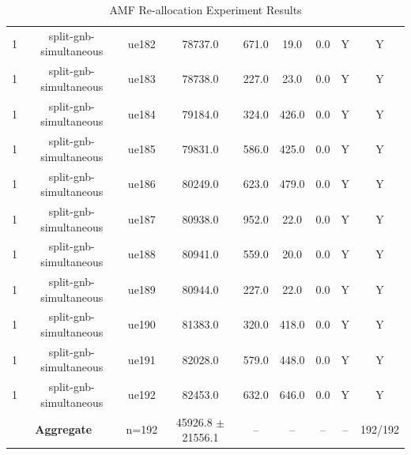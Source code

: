 \begin{table}[ht]
\begin{tabular}{|c|c|c|c|c|c|c|c|c|}
1 & split-gnb-simultaneous & ue182 & 78737.0 & 671.0 & 19.0 & 0.0 & Y & Y \\
1 & split-gnb-simultaneous & ue183 & 78738.0 & 227.0 & 23.0 & 0.0 & Y & Y \\
1 & split-gnb-simultaneous & ue184 & 79184.0 & 324.0 & 426.0 & 0.0 & Y & Y \\
1 & split-gnb-simultaneous & ue185 & 79831.0 & 586.0 & 425.0 & 0.0 & Y & Y \\
1 & split-gnb-simultaneous & ue186 & 80249.0 & 623.0 & 479.0 & 0.0 & Y & Y \\
1 & split-gnb-simultaneous & ue187 & 80938.0 & 952.0 & 22.0 & 0.0 & Y & Y \\
1 & split-gnb-simultaneous & ue188 & 80941.0 & 559.0 & 20.0 & 0.0 & Y & Y \\
1 & split-gnb-simultaneous & ue189 & 80944.0 & 227.0 & 22.0 & 0.0 & Y & Y \\
1 & split-gnb-simultaneous & ue190 & 81383.0 & 320.0 & 418.0 & 0.0 & Y & Y \\
1 & split-gnb-simultaneous & ue191 & 82028.0 & 579.0 & 448.0 & 0.0 & Y & Y \\
1 & split-gnb-simultaneous & ue192 & 82453.0 & 632.0 & 646.0 & 0.0 & Y & Y \\
\multicolumn{2}{|c|}{\textbf{Aggregate}} & n=192 & 45926.8 $\pm$ 21556.1 & -- & -- & -- & -- & 192/192 \\
\hline
\end{tabular}
\caption{AMF Re-allocation Experiment Results}
\label{tab:amf_realloc}
\end{table}

